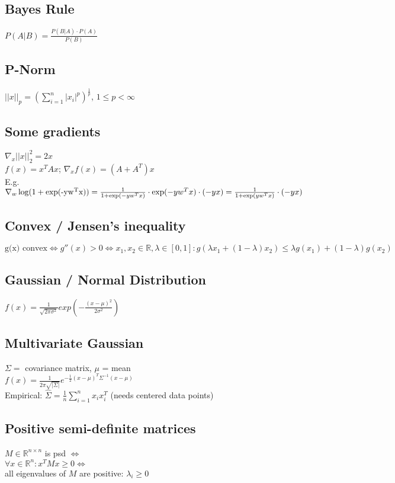\documentclass[11pt]{article}
\begin{document}
\begin{multicols*}{3}
	\subsection*{{Bayes Rule}}
	$P(A|B) = \frac{P(B|A) \cdot P(A)}{P(B)}$
	
	\subsection*{P-Norm}
	$||x||_p = (\sum_{i=1}^n|x_i|^p)^{\frac{1}{p}}$, $1 \leq p < \infty$
	
	\subsection*{Some gradients}
	$\nabla_x ||x||_2^2 = 2 x$\\
	$f(x) = x^T A x$; $\nabla_x f(x) = (A + A^T) x$\\
	E.g. $\nabla_w \operatorname{log}(1+\operatorname{exp(-y w^T x)}) = \\
	\frac{1}{1+\operatorname{exp}(-y w^T x)} \cdot \operatorname{exp}(-y w^T x) \cdot (-y x) = \\
	\frac{1}{1 + \operatorname{exp}(y w^T x)} \cdot(-yx)$\\
	
	
	\subsection*{Convex / Jensen's inequality}
	$\text{g(x) convex} \Leftrightarrow g''(x) > 0 \Leftrightarrow x_1,x_2 \in \mathbb{R}, \lambda \in [0,1]: 
	g(\lambda x_1 + (1-\lambda) x_2) \leq \lambda g(x_1) + (1-\lambda) g(x_2)$
	
	\subsection*{Gaussian / Normal Distribution}
	$f(x) = \frac{1}{\sqrt{2\pi\sigma^2}} exp(-\frac{(x-\mu)^2}{2\sigma^2})$
	
	\subsection*{Multivariate Gaussian}
	$\Sigma =$ covariance matrix, $\mu$ = mean\\
	$f(x) = \frac{1}{2\pi \sqrt{|\Sigma|}} e^{- \frac{1}{2} (x-\mu)^T \Sigma^{-1} (x-\mu)}$\\
	Empirical: $\hat{\Sigma} = \frac{1}{n}\sum_{i=1}^n x_i x_i^T$ (needs centered data points)
	
	\subsection*{Positive semi-definite matrices}
	$M \in \mathbb{R}^{n\times n}$ is psd $\Leftrightarrow$\\
	$\forall x \in \mathbb{R}^n: x^TMx \geq 0 \Leftrightarrow$\\
	all eigenvalues of $M$ are positive: $\lambda_i\geq 0$
	
		
	\end{multicols*}
	
\end{document}

